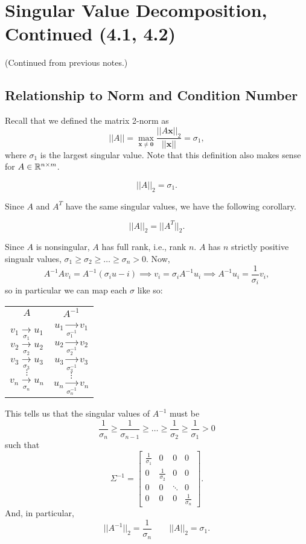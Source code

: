 \documentclass[letterpaper]{article}
\newcommand{\0}{\mathbf{0}}
\newcommand{\x}{\mathbf{x}}
\begin{document}
\section{Singular Value Decomposition, Continued (4.1, 4.2)}
(Continued from previous notes.)

\subsection{Relationship to Norm and Condition Number}
Recall that we defined the matrix 2-norm as  
\[||A|| = \max_{\x \neq \0} \frac{||A\x||_2}{||\x||} = \sigma_1,\] where $\sigma_1$ is the largest singular value. Note that this definition also makes sense for $A \in \mathbb{R}^{n \times m}$. 

\begin{theorem}{}{}
    \[||A||_2 = \sigma_1.\]
\end{theorem}

Since $A$ and $A^T$ have the same singular values, we have the following corollary. 
\begin{corollary}{}{}
    \[||A||_2 = ||A^T||_2.\]
\end{corollary}
Since $A$ is nonsingular, $A$ has full rank, i.e., rank $n$. $A$ has $n$ strictly positive singualr values, $\sigma_1 \geq \sigma_2 \geq \hdots \geq \sigma_n > 0$. Now, 
\[A^{-1} Av_i = A^{-1}(\sigma_i u-i) \implies v_i = \sigma_i A^{-1} u_i \implies A^{-1} u_i = \frac{1}{\sigma_i} v_i,\] so in particular we can map each $\sigma$ like so: 
\begin{center}
    \begin{tabular}{p{2in} p{2in}}
        \[A\] & \[A^{-1}\] \\ 
        \[v_1 \xrightarrow[\sigma_1]{} u_1\]
        \[v_2 \xrightarrow[\sigma_2]{} u_2\]
        \[v_3 \xrightarrow[\sigma_3]{} u_3\]
        \[\vdots\]
        \[v_n \xrightarrow[\sigma_n]{} u_n\] &
        \[u_1 \xrightarrow[\sigma_1^{-1}]{} v_1\]
        \[u_2 \xrightarrow[\sigma_2^{-1}]{} v_2\]
        \[u_3 \xrightarrow[\sigma_3^{-1}]{} v_3\]
        \[\vdots\]
        \[u_{n} \xrightarrow[\sigma_n^{-1}]{} v_n\]
    \end{tabular}
\end{center}
This tells us that the singular values of $A^{-1}$ must be \[\frac{1}{\sigma_n} \geq \frac{1}{\sigma_{n - 1}} \geq \hdots \geq \frac{1}{\sigma_2} \geq \frac{1}{\sigma_1} > 0\]
such that 
\[\Sigma^{-1} = \begin{bmatrix}
    \frac{1}{\sigma_1} & 0 & 0 & 0 \\ 
    0 & \frac{1}{\sigma_2} & 0 & 0 \\ 
    0 & 0 & \ddots & 0 \\ 
    0 & 0 & 0 & \frac{1}{\sigma_n} 
\end{bmatrix}.\]
And, in particular, \[||A^{-1}||_2 = \frac{1}{\sigma_n} \qquad ||A||_2 = \sigma_1.\]
\end{document}
